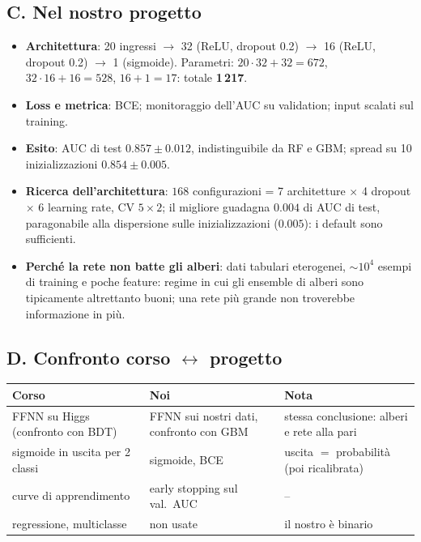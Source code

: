 \documentclass[11pt,a4paper]{article}
\begin{document}
\subsection*{C. Nel nostro progetto}
\begin{itemize}
\item \textbf{Architettura}: 20 ingressi $\to$ 32 (ReLU, dropout 0.2) $\to$ 16 (ReLU, dropout 0.2) $\to$ 1 (sigmoide). Parametri: $20\cdot32+32=672$, $32\cdot16+16=528$, $16+1=17$: totale \textbf{1\,217}.
\item \textbf{Loss e metrica}: BCE; monitoraggio dell'AUC su validation; input scalati sul training.
\item \textbf{Esito}: AUC di test $0.857\pm0.012$, indistinguibile da RF e GBM; spread su 10 inizializzazioni $0.854\pm0.005$.
\item \textbf{Ricerca dell'architettura}: $168$ configurazioni = 7 architetture $\times$ 4 dropout $\times$ 6 learning rate, CV $5\times2$; il migliore guadagna $0.004$ di AUC di test, paragonabile alla dispersione sulle inizializzazioni ($0.005$): i default sono sufficienti.
\item \textbf{Perch\'e la rete non batte gli alberi}: dati tabulari eterogenei, $\sim10^4$ esempi di training e poche feature: regime in cui gli ensemble di alberi sono tipicamente altrettanto buoni; una rete pi\`u grande non troverebbe informazione in pi\`u.
\end{itemize}

\subsection*{D. Confronto corso $\leftrightarrow$ progetto}
\begin{center}
\begin{tabular}{p{4.2cm}p{4.4cm}p{6.0cm}}
\toprule
Corso & Noi & Nota \\
\midrule
FFNN su Higgs (confronto con BDT) & FFNN sui nostri dati, confronto con GBM & stessa conclusione: alberi e rete alla pari \\
sigmoide in uscita per 2 classi & sigmoide, BCE & uscita $=$ probabilit\`a (poi ricalibrata) \\
curve di apprendimento & early stopping sul val.\ AUC & -- \\
regressione, multiclasse & non usate & il nostro \`e binario \\
\bottomrule
\end{tabular}
\end{center}
\end{document}
